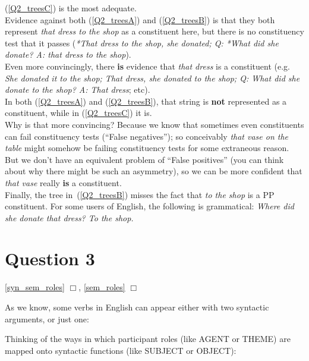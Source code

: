 \documentclass{article}
\begin{document}
\begin{answer}
{
(\ref{Q2_treesC}) is the most adequate.\\
Evidence against both (\ref{Q2_treesA}) and (\ref{Q2_treesB}) is that they both represent \emph{that dress to the shop} as a constituent here, but there is no constituency test that it passes (\emph{*That dress to the shop, she donated; Q: *What did she donate? A: that dress to the shop}).\\
Even more convincingly, there \textbf{is} evidence that \emph{that dress} is a constituent (e.g. \emph{She donated it to the shop; That dress, she donated to the shop; Q: What did she donate to the shop? A: That dress}; etc).\\
In both (\ref{Q2_treesA}) and (\ref{Q2_treesB}), that string is \textbf{not} represented as a constituent, while in (\ref{Q2_treesC}) it is.\\
Why is that more convincing? Because we know that sometimes even constituents can fail constituency tests (``False negatives''); so conceivably \emph{that vase on the table} might somehow be failing constituency tests for some extraneous reason.
But we don't have an equivalent problem of ``False positives'' (you can think about why there might be such an asymmetry), so we can be more confident that \emph{that vase} really \textbf{is} a constituent.\\
Finally, the tree in~(\ref{Q2_treesB}) misses the fact that \emph{to the shop} is a PP constituent. For some users of English, the following is grammatical: \emph{Where did she donate that dress? To the shop.}
}
\end{answer}


\section*{Question 3}
\hfill{}
\ref{syn_sem_roles} $\Box$,
\ref{sem_roles} $\Box$

As we know, some verbs in English can appear either with two syntactic arguments, or just one:
\begin{exe}
    \label{semantic_rolesA}
    \label{semantic_rolesB}
\end{exe}
Thinking of the ways in which participant roles (like AGENT or THEME) are mapped onto syntactic functions (like SUBJECT or OBJECT):
\end{document}
